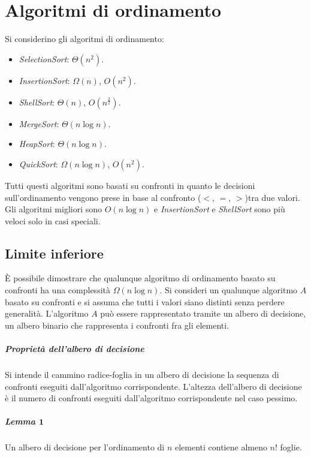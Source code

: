 \chapter{Algoritmi di ordinamento}
Si considerino gli algoritmi di ordinamento:
\begin{multicols}{2}
	\begin{itemize}
		\item \emph{SelectionSort}: $\Theta(n^2)$.
		\item \emph{InsertionSort}: $\Omega(n)$, $O(n^2)$.
		\item \emph{ShellSort}: $\Theta(n)$, $O(n^\frac{3}{2})$.
		\item \emph{MergeSort}: $\Theta(n\log n)$.
		\item \emph{HeapSort}: $\Theta(n\log n)$.
		\item \emph{QuickSort}: $\Omega(n\log n)$, $O(n^2)$.
	\end{itemize}
\end{multicols}
Tutti questi algoritmi sono basati su confronti in quanto le decisioni sull'ordinamento vengono prese in base al confronto ($<$, $=$, $>$)tra due valori. Gli algoritmi migliori sono
$O(n\log n)$ e \emph{InsertionSort} e \emph{ShellSort} sono pi\`u veloci solo in casi speciali. 
\section{Limite inferiore}
\`E possibile dimostrare che qualunque algoritmo di ordinamento basato su confronti ha una complessit\`a $\Omega(n\log n)$. Si consideri un qualunque algoritmo $A$ basato su confronti e
si assuma che tutti i valori siano distinti senza perdere generalit\`a. L'algoritmo $A$ pu\`o essere rappresentato tramite un albero di decisione, un albero binario che rappresenta i 
confronti fra gli elementi. 
\paragraph{Propriet\`a dell'albero di decisione}
Si intende il cammino radice-foglia in un albero di decisione la sequenza di confronti eseguiti dall'algoritmo corrispondente. L'altezza dell'albero di decisione \`e il numero di 
confronti eseguiti dall'algoritmo corrispondente nel caso pessimo. 
\paragraph{Lemma $\mathbf{1}$}
Un albero di decisione per l'ordinamento di $n$ elementi contiene almeno $n!$ foglie. 
